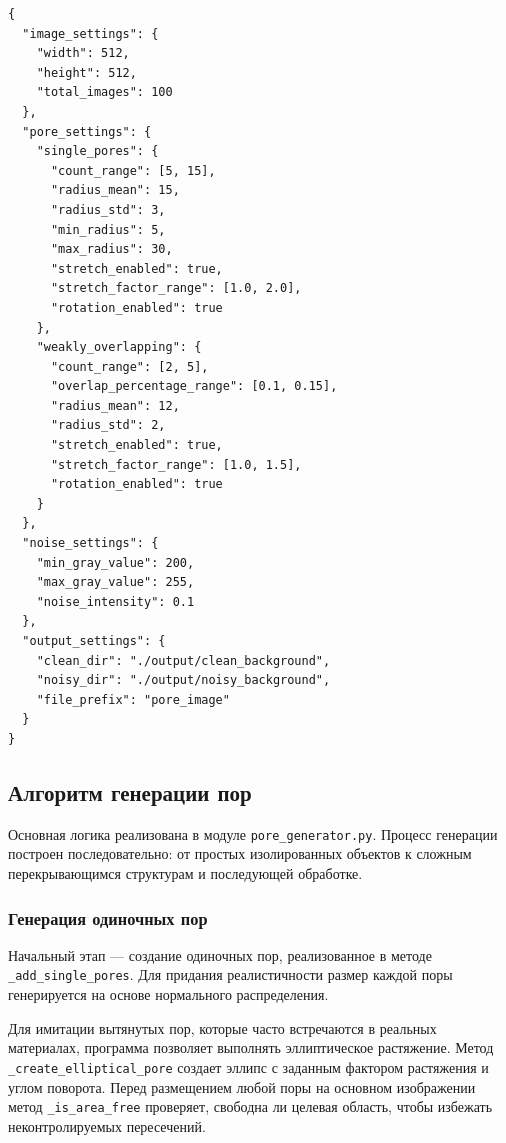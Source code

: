 \documentclass[code]{wordcore}
\begin{document}
\begin{code}
	\begin{verbatim}
{
  "image_settings": {
    "width": 512,
    "height": 512,
    "total_images": 100
  },
  "pore_settings": {
    "single_pores": {
      "count_range": [5, 15],
      "radius_mean": 15,
      "radius_std": 3,
      "min_radius": 5,
      "max_radius": 30,
      "stretch_enabled": true,
      "stretch_factor_range": [1.0, 2.0],
      "rotation_enabled": true
    },
    "weakly_overlapping": {
      "count_range": [2, 5],
      "overlap_percentage_range": [0.1, 0.15],
      "radius_mean": 12,
      "radius_std": 2,
      "stretch_enabled": true,
      "stretch_factor_range": [1.0, 1.5],
      "rotation_enabled": true
    }
  },
  "noise_settings": {
    "min_gray_value": 200,
    "max_gray_value": 255,
    "noise_intensity": 0.1
  },
  "output_settings": {
    "clean_dir": "./output/clean_background",
    "noisy_dir": "./output/noisy_background",
    "file_prefix": "pore_image"
  }
}
  \end{verbatim}
\end{code}

\subsection{Алгоритм генерации пор}

Основная логика реализована в модуле \texttt{pore\_generator.py}. Процесс генерации построен последовательно: от простых изолированных объектов к сложным перекрывающимся структурам и последующей обработке.

\subsubsection{Генерация одиночных пор}

Начальный этап --- создание одиночных пор, реализованное в методе \texttt{\_add\_single\_pores}. Для придания реалистичности размер каждой поры генерируется на основе нормального распределения.

Для имитации вытянутых пор, которые часто встречаются в реальных материалах, программа позволяет выполнять эллиптическое растяжение. Метод \texttt{\_create\_elliptical\_pore} создает эллипс с заданным фактором растяжения и углом поворота. Перед размещением любой поры на основном изображении метод \texttt{\_is\_area\_free} проверяет, свободна ли целевая область, чтобы избежать неконтролируемых пересечений.
\end{document}
